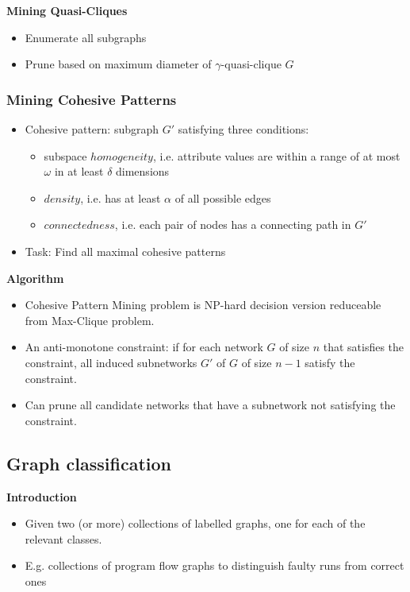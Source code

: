 \documentclass[../notes.tex]{subfiles}
\begin{document}
\textbf{Mining Quasi-Cliques}
\begin{itemize}
  \item Enumerate all subgraphs
  \item Prune based on maximum diameter of $\gamma$-quasi-clique $G$
\end{itemize}

\subsubsection{Mining Cohesive Patterns}
\begin{itemize}
  \item Cohesive pattern: subgraph $G'$ satisfying three conditions:
  \begin{itemize}
    \item subspace $homogeneity$, i.e. attribute values are within a range of at most $\omega$ in at least $\delta$ dimensions
    \item $density$, i.e. has at least $\alpha$ of all possible edges
    \item $connectedness$, i.e. each pair of nodes has a connecting path in $G'$
  \end{itemize}

  \item Task: Find all maximal cohesive patterns
\end{itemize}

\textbf{Algorithm}
\begin{itemize}
  \item Cohesive Pattern Mining problem is NP-hard decision version reduceable from Max-Clique problem.
  \item An anti-monotone constraint: if for each network $G$ of size $n$ that satisfies the constraint, all induced subnetworks $G'$ of $G$ of size $n-1$ satisfy the constraint.
  \item Can prune all candidate networks that have a subnetwork not satisfying the constraint.
\end{itemize}

\subsection{Graph classification}

\textbf{Introduction}
\begin{itemize}
  \item Given two (or more) collections of labelled graphs, one for each of the relevant classes.
  \item E.g. collections of program flow graphs to distinguish faulty runs from correct ones
\end{itemize}
\end{document}
